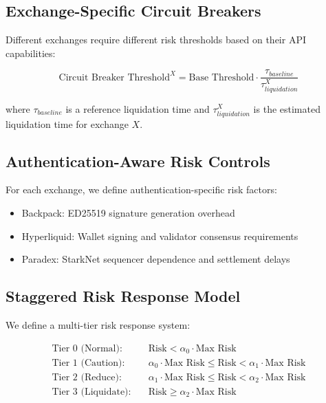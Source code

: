 \documentclass{article}
\begin{document}
\subsection{Exchange-Specific Circuit Breakers}

Different exchanges require different risk thresholds based on their API capabilities:

\begin{equation}
\text{Circuit Breaker Threshold}^X = \text{Base Threshold} \cdot \frac{\tau_{baseline}}{\tau_{liquidation}^X}
\end{equation}

where $\tau_{baseline}$ is a reference liquidation time and $\tau_{liquidation}^X$ is the estimated liquidation time for exchange $X$.

\subsection{Authentication-Aware Risk Controls}

For each exchange, we define authentication-specific risk factors:

\begin{itemize}
    \item Backpack: ED25519 signature generation overhead
    \item Hyperliquid: Wallet signing and validator consensus requirements
    \item Paradex: StarkNet sequencer dependence and settlement delays
\end{itemize}

\subsection{Staggered Risk Response Model}

We define a multi-tier risk response system:

\begin{align}
\text{Tier 0 (Normal):} & \quad \text{Risk} < \alpha_0 \cdot \text{Max Risk} \\
\text{Tier 1 (Caution):} & \quad \alpha_0 \cdot \text{Max Risk} \leq \text{Risk} < \alpha_1 \cdot \text{Max Risk} \\
\text{Tier 2 (Reduce):} & \quad \alpha_1 \cdot \text{Max Risk} \leq \text{Risk} < \alpha_2 \cdot \text{Max Risk} \\
\text{Tier 3 (Liquidate):} & \quad \text{Risk} \geq \alpha_2 \cdot \text{Max Risk}
\end{align}
\end{document}
